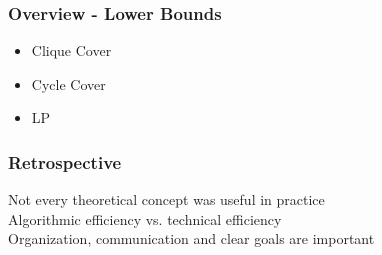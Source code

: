 \documentclass[usenames,dvipsnames]{beamer}[12pt]
\begin{document}
	\begin{frame}
		\frametitle{Overview - Lower Bounds}
		
		\begin{itemize}
			\item Clique Cover
			\item Cycle Cover
			\item LP
		\end{itemize}
	\end{frame}

	\begin{frame}
		\frametitle{Retrospective}
		
		Not every theoretical concept was useful in practice \\
		\pause
		\vspace{8mm}
		Algorithmic efficiency vs. technical efficiency \\
		\pause
		\vspace{8mm}
		Organization, communication and clear goals are important\\
	\end{frame}
\end{document}
